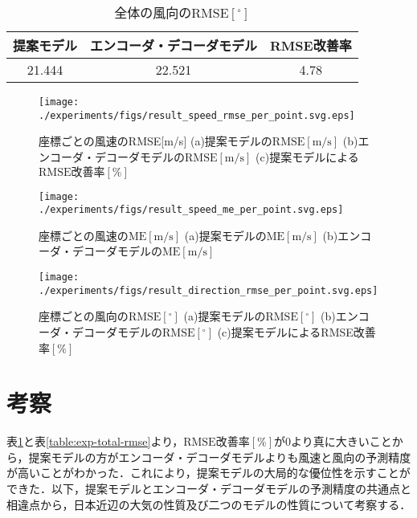 \begin{table}[bp]
  \caption{全体の風向の$\mathrm{RMSE[^\circ]}$}
  \label{table:exp-total-direction-rmse}
  \centering
  \begin{tabular}{ccc}
    \hline
    提案モデル & エンコーダ・デコーダモデル & RMSE改善率 \\
    \hline
    21.444 & 22.521 & 4.78 \\
    \hline
  \end{tabular}
\end{table}

\begin{figure}[bp]
  \centering
  \texttt{[image: ./experiments/figs/result\_speed\_rmse\_per\_point.svg.eps]}
  \caption{座標ごとの風速のRMSE[m/s] (a)提案モデルの$\mathrm{RMSE[m/s]}$ (b)エンコーダ・デコーダモデルの$\mathrm{RMSE[m/s]}$ (c)提案モデルによる$\mathrm{RMSE改善率[\%]}$}
  \label{fig:exp-speed-rmse-per-point}
\end{figure}

\begin{figure}[bp]
  \centering
  \texttt{[image: ./experiments/figs/result\_speed\_me\_per\_point.svg.eps]}
  \caption{座標ごとの風速の$\mathrm{ME[m/s]}$ (a)提案モデルの$\mathrm{ME[m/s]}$ (b)エンコーダ・デコーダモデルの$\mathrm{ME[m/s]}$}
  \label{fig:exp-speed-ma-per-point}
\end{figure}

\begin{figure}[bp]
  \centering
  \texttt{[image: ./experiments/figs/result\_direction\_rmse\_per\_point.svg.eps]}
  \caption{座標ごとの風向の$\mathrm{RMSE[^\circ]}$ (a)提案モデルの$\mathrm{RMSE[^\circ]}$ (b)エンコーダ・デコーダモデルの$\mathrm{RMSE[^\circ]}$ (c)提案モデルによるRMSE改善率$\mathrm{[\%]}$}
  \label{fig:exp-direction-rmse-per-point}
\end{figure}

\section{考察 \label{section:exp-discussion}}
表\ref{table:exp-total-direction-rmse}と表\ref{table:exp-total-rmse}より，$\mathrm{RMSE改善率[\%]}$が0より真に大きいことから，提案モデルの方がエンコーダ・デコーダモデルよりも風速と風向の予測精度が高いことがわかった．これにより，提案モデルの大局的な優位性を示すことができた．以下，提案モデルとエンコーダ・デコーダモデルの予測精度の共通点と相違点から，日本近辺の大気の性質及び二つのモデルの性質について考察する．

